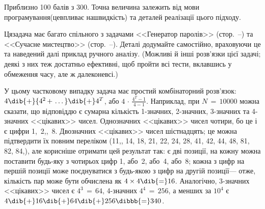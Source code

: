 \Tutorial
{} Приблизно 100 балів з 300. Точна величина залежить від мови програмування\linebreak[2] (це\nolinebreak[3] впливає на\nolinebreak[2] швидкість) та деталей реалізації цього підходу.

Ця\nolinebreak[3] задача має багато спільного з задачами <<Генератор паролів>> (стор.~\mbox{\pageref{text:201415-3-C-start}--\pageref{text:201415-3-C-finish}}) та <<Сучасне мистецтво>> (стор.~\mbox{\pageref{text:201516-2-C-start}--\pageref{text:201516-2-C-finish}}). Деталі додумайте самостійно, враховуючи це та наведений далі приклад ручного аналізу. (Можливі й інші розв'язки цієї задачі; деякі з них теж достатньо ефективні, щоб пройти всі тести, вклавшись у обмеження часу, але ж далеко\nolinebreak[3] не\nolinebreak[3] всі.)

У цьому частковому випадку задача має простий комбінаторний розв'язок: $4\dib{{+}}{4^2\,{+}\,\dots}\dib{{+}}4^{T}$, або $4\,{\cdot}\,\frac{4^T-1}{4-1}$. Наприклад, при ${N\,{=}\,10000}$ можна сказати, що відповіддю є сумарна кількість \mbox{1-знач}\-них, \mbox{2-знач}\-них, \mbox{3-знач}\-них та \mbox{4-знач}\-них <<цікавих>> чисел. Однозначних <<цікавих>> чисел чотири, бо це і є цифри 1,~2,,~8. Двозначних <<цікавих>> чисел шіст\-над\-цять; це можна підтвердити їх повним переліком
(11,,
14,
18,
21,
22,
24,
28,
41,
42,
44,
48,
81,
82,
84,),
але %
корисніше отримати цей результат так: є дві позиції, на кожну можна поставити будь-яку з чотирьох цифр 1, або~2, або~4, або~8; кожна з цифр на першій позиції може поєднуватися з будь-якою з цифр на другій позиції\nolinebreak[3] --- отже, %
кількість пар може бути обчислена як ${4\times4}\dib{{=}}16$. Аналогічно, \mbox{3-знач}\-них <<цікавих>> чисел є ${4^3\,{=}\,64}$, \mbox{4-знач}\-них ${4^4\,{=}\,256}$, а менших за $10^4$ є $4\dib{{+}}16\dib{{+}}64\dib{{+}}256\dibbb{{=}}340$.

